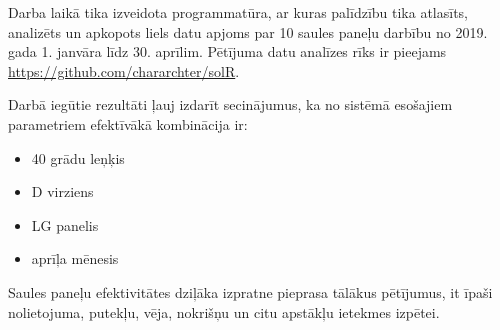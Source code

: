 Darba laikā tika izveidota programmatūra, ar kuras palīdzību tika atlasīts, analizēts un apkopots liels datu apjoms par 10 saules paneļu darbību no 2019. gada 1. janvāra līdz 30. aprīlim. Pētījuma datu analīzes rīks ir pieejams \url{https://github.com/chararchter/solR}.

Darbā iegūtie rezultāti ļauj izdarīt secinājumus, ka no sistēmā esošajiem parametriem efektīvākā kombinācija ir:
\begin{itemize}
	\item 40 grādu leņķis
	\item D virziens
	\item LG panelis
	\item aprīļa mēnesis
\end{itemize}


Saules paneļu efektivitātes dziļāka izpratne pieprasa tālākus pētījumus, it īpaši nolietojuma, putekļu, vēja, nokrišņu un citu apstākļu ietekmes izpētei.